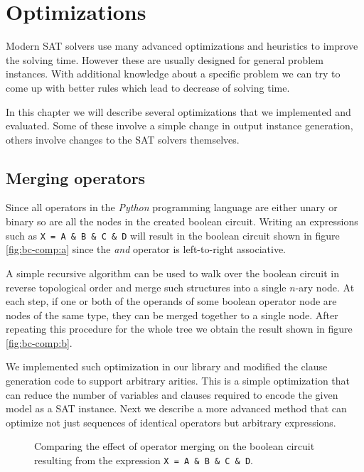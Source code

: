 \chapter{Optimizations}

Modern SAT solvers use many advanced optimizations and heuristics to improve the solving time.
However these are usually designed for general problem instances.
With additional knowledge about a specific problem we can try to come up with better rules which lead to decrease of solving time.

In this chapter we will describe several optimizations that we implemented and evaluated.
Some of these involve a simple change in output instance generation, others involve changes to the SAT solvers themselves.

\section{Merging operators}
\label{sec:merging-operators}
Since all operators in the \emph{Python} programming language are either unary or binary so are all the nodes in the created boolean circuit.
Writing an expressions such as \texttt{X = A \& B \& C \& D} will result in the boolean circuit shown in figure \ref{fig:bc-comp:a} since the \emph{and} operator is left-to-right associative.

A simple recursive algorithm can be used to walk over the boolean circuit in reverse topological order and merge such structures into a single $n$-ary node.
At each step, if one or both of the operands of some boolean operator node are nodes of the same type, they can be merged together to a single node.
After repeating this procedure for the whole tree we obtain the result shown in figure \ref{fig:bc-comp:b}.

We implemented such optimization in our library and modified the clause generation code to support arbitrary arities.
This is a simple optimization that can reduce the number of variables and clauses required to encode the given model as a SAT instance.
Next we describe a more advanced method that can optimize not just sequences of identical operators but arbitrary expressions.

\begin{figure}
\centering
{}
\hspace{2cm}
\caption{Comparing the effect of operator merging on the boolean circuit resulting from the expression \texttt{X = A \& B \& C \& D}.}
\end{figure}

